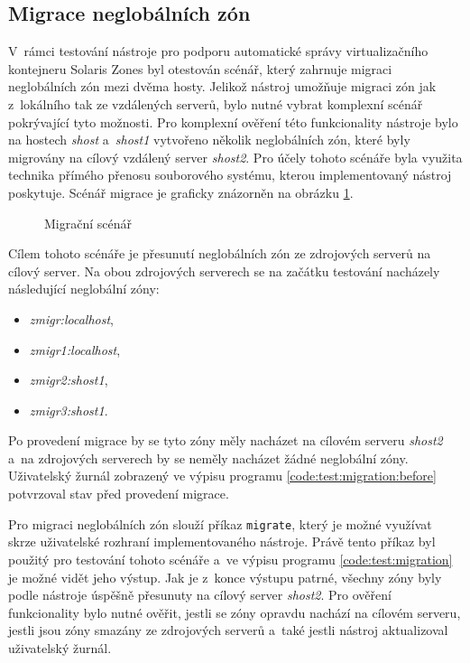 \subsection{Migrace neglobálních zón}
\label{chapter:testing:scenario:migration}
V~rámci testování nástroje pro podporu automatické správy virtualizačního kontejneru Solaris Zones byl otestován scénář, který
zahrnuje migraci neglobálních zón mezi dvěma hosty. Jelikož nástroj umožňuje migraci zón jak z~lokálního tak ze vzdálených serverů,
bylo nutné vybrat komplexní scénář pokrývající tyto možnosti. Pro komplexní ověření této funkcionality nástroje bylo na hostech 
\textit{shost} a~\textit{shost1} vytvořeno několik neglobálních zón, které byly migrovány na cílový vzdálený server \textit{shost2}. 
Pro účely tohoto scénáře byla využita technika přímého přenosu souborového systému, kterou implementovaný nástroj poskytuje.
Scénář migrace je graficky znázorněn na obrázku \ref{image:testing:migration}.
\begin{figure}
    \centering    
    \caption{Migrační scénář}
    \label{image:testing:migration}
\end{figure}

Cílem tohoto scénáře je přesunutí neglobálních zón ze zdrojových serverů na cílový server. Na obou zdrojových serverech se na
začátku testování nacházely následující neglobální zóny:
\begin{itemize}
 \item \textit{zmigr:localhost},
 \item \textit{zmigr1:localhost},
 \item \textit{zmigr2:shost1},
 \item \textit{zmigr3:shost1}.
\end{itemize}
Po provedení migrace by se tyto zóny měly nacházet na cílovém serveru \textit{shost2} a~na zdrojových serverech by se neměly
nacházet žádné neglobální zóny. Uživatelský žurnál zobrazený ve výpisu programu \ref{code:test:migration:before} potvrzoval
stav před provedení migrace.
 
Pro migraci neglobálních zón slouží příkaz \verb|migrate|, který je možné využívat skrze uživatelské rozhraní implementovaného
nástroje. Právě tento příkaz byl použitý pro testování tohoto scénáře a~ve výpisu programu \ref{code:test:migration} je možné vidět jeho
výstup. Jak je z~konce výstupu patrné, všechny zóny byly podle nástroje úspěšně přesunuty na cílový server \textit{shost2}. 
Pro ověření funkcionality bylo nutné ověřit, jestli se zóny opravdu nachází na cílovém serveru, jestli jsou zóny smazány
ze zdrojových serverů a~také jestli nástroj aktualizoval uživatelský žurnál. 

